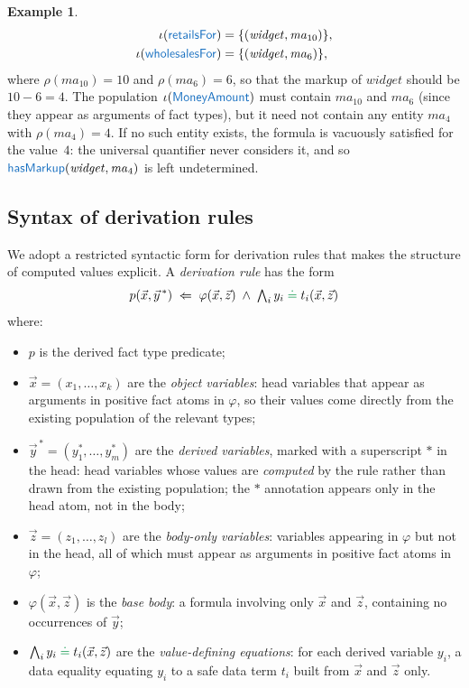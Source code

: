 \documentclass[11pt]{amsart}
\theoremstyle{definition}
\newtheorem{example}{Example}
\theoremstyle{remark}
\newcommand{\pr}[1]{\mathsf{\textcolor{RoyalBlue}{#1}}}
\newcommand{\dataEq}{\mathrel{\textcolor{ForestGreen}{\doteq}}}
\begin{document}
\begin{example}
\begin{align*}
  \iota(\pr{retailsFor})   &= \{ (\mathit{widget}, \mathit{ma}_{10}) \}, \\
  \iota(\pr{wholesalesFor}) &= \{ (\mathit{widget}, \mathit{ma}_{6}) \},
\end{align*}
where $\rho(\mathit{ma}_{10}) = 10$ and $\rho(\mathit{ma}_6) = 6$,
so that the markup of $\mathit{widget}$ should be $10 - 6 = 4$.
The population $\iota(\pr{MoneyAmount})$ must contain $\mathit{ma}_{10}$
and $\mathit{ma}_6$ (since they appear as arguments of fact types), but
it need not contain any entity $\mathit{ma}_4$ with $\rho(\mathit{ma}_4)
= 4$. If no such entity exists, the formula is vacuously satisfied for the
value~$4$: the universal quantifier never considers it, and so
$\pr{hasMarkup}(\mathit{widget}, \mathit{ma}_4)$ is left undetermined.
\end{example}

\subsection*{Syntax of derivation rules}

We adopt a restricted syntactic form for derivation rules that makes the
structure of computed values explicit. A \emph{derivation rule} has the
form
$$p(\vec{x}, \vec{y}^{\,*}) \;\Leftarrow\;
  \varphi(\vec{x}, \vec{z}) \;\wedge\;
  \textstyle\bigwedge_i y_i \dataEq t_i(\vec{x}, \vec{z})$$
where:
\begin{itemize}
  \item $p$ is the derived fact type predicate;
  \item $\vec{x} = (x_1, \ldots, x_k)$ are the \emph{object variables}:
    head variables that appear as arguments in positive fact atoms in
    $\varphi$, so their values come directly from the existing population
    of the relevant types;
  \item $\vec{y}^{\,*} = (y_1^*, \ldots, y_m^*)$ are the \emph{derived
    variables}, marked with a superscript $*$ in the head: head variables
    whose values are \emph{computed} by the rule rather than drawn from
    the existing population; the $*$ annotation appears only in the head
    atom, not in the body;
  \item $\vec{z} = (z_1, \ldots, z_l)$ are the \emph{body-only variables}:
    variables appearing in $\varphi$ but not in the head, all of which must
    appear as arguments in positive fact atoms in $\varphi$;
  \item $\varphi(\vec{x}, \vec{z})$ is the \emph{base body}: a formula
    involving only $\vec{x}$ and $\vec{z}$, containing no occurrences of
    $\vec{y}$;
  \item $\bigwedge_i y_i \dataEq t_i(\vec{x}, \vec{z})$ are the
    \emph{value-defining equations}: for each derived variable $y_i$, a
    data equality equating $y_i$ to a safe data term $t_i$ built from
    $\vec{x}$ and $\vec{z}$ only.
\end{itemize}
\end{document}

